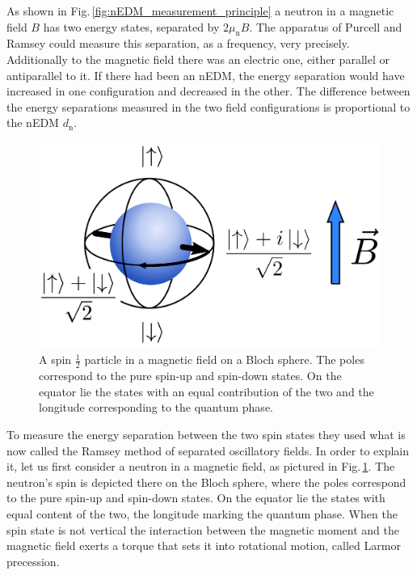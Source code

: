As shown in Fig.\,\ref{fig:nEDM_measurement_principle} a neutron in a magnetic field $B$ has two energy states, separated by $2 \mu_\text{n} B$. The apparatus of Purcell and Ramsey could measure this separation, as a frequency, very precisely. Additionally to the magnetic field there was an electric one, either parallel or antiparallel to it. If there had been an nEDM, the energy separation would have increased in one configuration and decreased in the other. The difference between the energy separations measured in the two field configurations is proportional to the nEDM $d_\text{n}$.

\begin{figure}
  \centering
  \includegraphics[width=.6\linewidth]{gfx/nEDMatPSI/bloch_sphere.png}
  \caption{A spin $\tfrac{1}{2}$ particle in a magnetic field on a Bloch sphere. The poles correspond to the pure spin-up and spin-down states. On the equator lie the states with an equal contribution of the two and the longitude corresponding to the quantum phase.}
  \label{fig:nEDM_bloch_sphere}
\end{figure}

To measure the energy separation between the two spin states they used what is now called the Ramsey method of separated oscillatory fields. In order to explain it, let us first consider a neutron in a magnetic field, as pictured in Fig.\,\ref{fig:nEDM_bloch_sphere}. The neutron's spin is depicted there on the Bloch sphere, where the poles correspond to the pure spin-up and spin-down states. On the equator lie the states with equal content of the two, the longitude marking the quantum phase. When the spin state is not vertical the interaction between the magnetic moment and the magnetic field exerts a torque that sets it into rotational motion, called Larmor precession.


